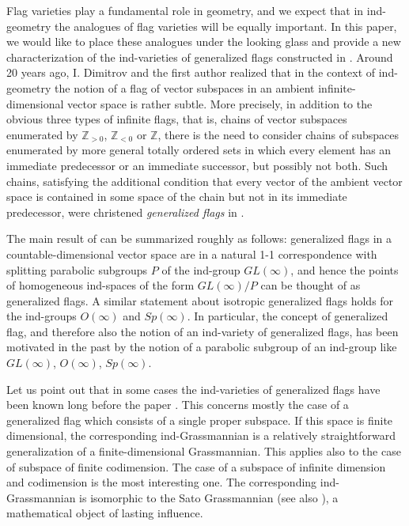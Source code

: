 \documentclass[12pt]{amsart}
\theoremstyle{definition}
\begin{document}
Flag varieties play a fundamental role in geometry, and we expect
that in ind-geometry the analogues of flag varieties will be equally
important. In this paper, we 
would like to place these analogues under the looking glass and 
provide a new characterization of the ind-varieties of generalized 
flags constructed in \cite{DP}. Around 20 years ago, I. Dimitrov 
and the first author realized that in the context of 
ind-geometry the notion of a flag of vector subspaces in an
ambient infinite-dimensional vector space is rather 
subtle. More precisely, in addition to the obvious three 
types of infinite flags, that is, chains of vector subspaces 
enumerated by $\mathbb{Z}_{>0}$, $\mathbb{Z}_{<0}$ or  
$\mathbb{Z}$, there is the need to consider chains of 
subspaces enumerated by more general totally ordered sets in 
which every element has an immediate predecessor or an 
immediate successor, but possibly not both. Such chains, 
satisfying the additional
condition that every vector of the ambient vector space is 
contained in some space of the chain but not in its immediate 
predecessor, were christened \textit{generalized flags} in 
\cite{DP}. 

The main result of \cite{DP} can be summarized 
roughly as follows: generalized flags in a 
countable-dimensional vector space are in a natural 1-1 
correspondence with splitting parabolic subgroups $P$ of the 
ind-group $GL(\infty)$, and hence the points of homogeneous 
ind-spaces of the form $GL(\infty)/P$ can be thought of as 
generalized flags. A similar statement about isotropic 
generalized flags holds for the ind-groups $O(\infty)$ and 
$Sp(\infty)$. In particular, the concept of generalized flag, 
and therefore also the notion of an ind-variety of 
generalized flags, has been motivated in the past by the 
notion of a parabolic subgroup of an ind-group like 
$GL(\infty)$, $O(\infty)$, $Sp(\infty)$. 

Let us point out that in some cases the ind-varieties of 
generalized flags have been known long before the paper \cite{DP}.
This concerns mostly the case of a generalized flag which consists of 
a single proper subspace. If this space is finite dimensional,
the corresponding ind-Grassmannian is a relatively straightforward
generalization of a finite-dimensional Grassmannian. This applies
also to the case of subspace of finite codimension. The case of a
subspace of infinite dimension and codimension is the most
interesting one. The corresponding ind-Grassmannian is isomorphic
to the Sato Grassmannian \cite{Sa} (see also \cite{GH}), a mathematical object of lasting influence. 
\end{document}
